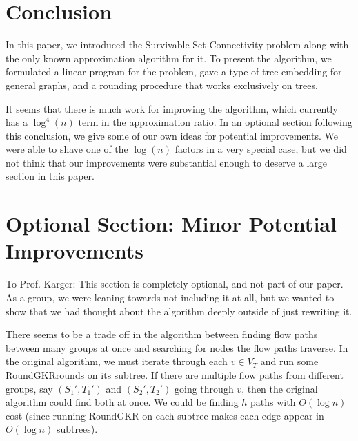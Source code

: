 \documentclass[12pt]{article}
\begin{document}
\section{Conclusion}

In this paper, we introduced the Survivable Set Connectivity problem along with the only known approximation algorithm for it. To present the algorithm, we formulated a linear program for the problem, gave a type of tree embedding for general graphs, and a rounding procedure that works exclusively on trees.

It seems that there is much work for improving the algorithm, which currently has a $\log^4(n)$ term in the approximation ratio. In an optional section following this conclusion, we give some of our own ideas for potential improvements. We were able to shave one of the $\log(n)$ factors in a very special case, but we did not think that our improvements were substantial enough to deserve a large section in this paper.

\section{Optional Section: Minor Potential Improvements}

To Prof. Karger: This section is completely optional, and not part of our paper. As a group, we were leaning towards not including it at all, but we wanted to show that we had thought about the algorithm deeply outside of just rewriting it.

There seems to be a trade off in the algorithm between finding flow paths between many groups at once and searching for nodes the flow paths traverse. In the original algorithm, we must iterate through each $v \in V_T$ and run some RoundGKRrounds on its subtree. If there are multiple flow paths from different groups, say $(S_1', T_1')$ and $(S_2', T_2')$ going through $v$, then the original algorithm could find both at once. We could be finding $h$ paths with $O(\log n)$ cost (since running RoundGKR on each subtree makes each edge appear in $O(\log n)$ subtrees). 
\end{document}
